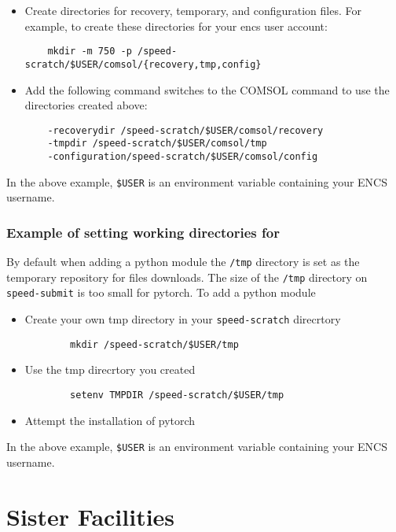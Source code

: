 \documentclass{easychair}
\begin{document}
\begin{itemize}
	\item 
	Create directories for recovery, temporary, and configuration files. 
	For example, to create these directories for your encs user account:
	\begin{verbatim}
	mkdir -m 750 -p /speed-scratch/$USER/comsol/{recovery,tmp,config}
	\end{verbatim}
	\item
	Add the following command switches to the COMSOL command to use the 
	directories created above:
	\begin{verbatim} 
	-recoverydir /speed-scratch/$USER/comsol/recovery 
	-tmpdir /speed-scratch/$USER/comsol/tmp
	-configuration/speed-scratch/$USER/comsol/config
	\end{verbatim}
\end{itemize} 
In the above example, \verb!$USER! is an environment variable containing your ENCS username.
\subsubsection{Example of setting working directories for }

By default when adding a python module the \texttt{/tmp} directory is set as the temporary repository for files downloads. 
The size of the \texttt{/tmp} directory on \verb!speed-submit! is too small for pytorch.
To add a python module
\begin{itemize}
    \item 	
	Create your own tmp directory in your \verb!speed-scratch! direcrtory
	\begin{verbatim} 
        mkdir /speed-scratch/$USER/tmp
	\end{verbatim}
	\item
    Use the tmp direcrtory you created
	\begin{verbatim} 
        setenv TMPDIR /speed-scratch/$USER/tmp
	\end{verbatim}
    \item
	Attempt the installation of pytorch
\end{itemize}

In the above example, \verb!$USER! is an environment variable containing your ENCS username.
\section{Sister Facilities}
\end{document}
